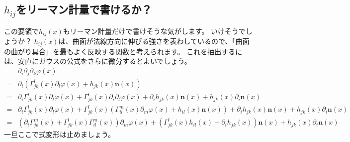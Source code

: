 \subsection{$h_{ij}$をリーマン計量で書けるか？}

この要領で$h_{ij}(x)$もリーマン計量だけで書けそうな気がします。
いけそうでしょうか？
$h_{ij}(x)$は、曲面が法線方向に伸びる強さを表わしているので、「曲面の曲がり具合」を最もよく反映する関数と考えられます。
これを抽出するには、安直にガウスの公式をさらに微分するとよいでしょう。
\begin{align*}
  &\partial_i\partial_j\partial_k\varphi(x)\\
  =&\partial_i\left(\Gamma_{jk}^l(x)\partial_l\varphi(x)+h_{jk}(x)\mathbf{n}(x)\right)\\
  =&\partial_i\Gamma_{jk}^l(x)\partial_l\varphi(x)+\Gamma_{jk}^l(x)\partial_i\partial_l\varphi(x)+\partial_ih_{jk}(x)\mathbf{n}(x)+h_{jk}(x)\partial_i\mathbf{n}(x)\\
  =&\partial_i\Gamma_{jk}^l(x)\partial_l\varphi(x)+\Gamma_{jk}^l(x)\left(\Gamma_{il}^m(x)\partial_m\varphi(x)+h_{il}(x)\mathbf{n}(x)\right)+\partial_ih_{jk}(x)\mathbf{n}(x)+h_{jk}(x)\partial_i\mathbf{n}(x)\\
  =&\left(\partial_i\Gamma_{jk}^m(x)+\Gamma_{jk}^l(x)\Gamma_{il}^m(x)\right)\partial_m\varphi(x)+\left(\Gamma_{jk}^l(x)h_{il}(x)+\partial_ih_{jk}(x)\right)\mathbf{n}(x)+h_{jk}(x)\partial_i\mathbf{n}(x)
\end{align*}
一旦ここで式変形は止めましょう。

